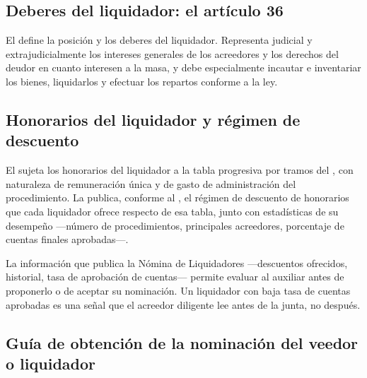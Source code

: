 \subsection{Deberes del liquidador: el artículo 36}

El  define la posición y los deberes del liquidador. Representa judicial y
extrajudicialmente los intereses generales de los acreedores y los derechos del deudor en
cuanto interesen a la masa, y debe especialmente incautar e inventariar los bienes,
liquidarlos y efectuar los repartos conforme a la ley.

\subsection{Honorarios del liquidador y régimen de descuento}

El  sujeta los honorarios del liquidador a la tabla progresiva por tramos del ,
con naturaleza de remuneración única y de gasto de administración del procedimiento. La
 publica, conforme al , el régimen de descuento de
honorarios que cada liquidador ofrece respecto de esa tabla, junto con estadísticas de su
desempeño ---número de procedimientos, principales acreedores, porcentaje de cuentas finales
aprobadas---.

\begin{foco}
La información que publica la Nómina de Liquidadores ---descuentos ofrecidos, historial,
tasa de aprobación de cuentas--- permite evaluar al auxiliar antes de proponerlo o de
aceptar su nominación. Un liquidador con baja tasa de cuentas aprobadas es una señal que el
acreedor diligente lee antes de la junta, no después.
\end{foco}

\bloquePractico

\subsection{Guía de obtención de la nominación del veedor o liquidador}

